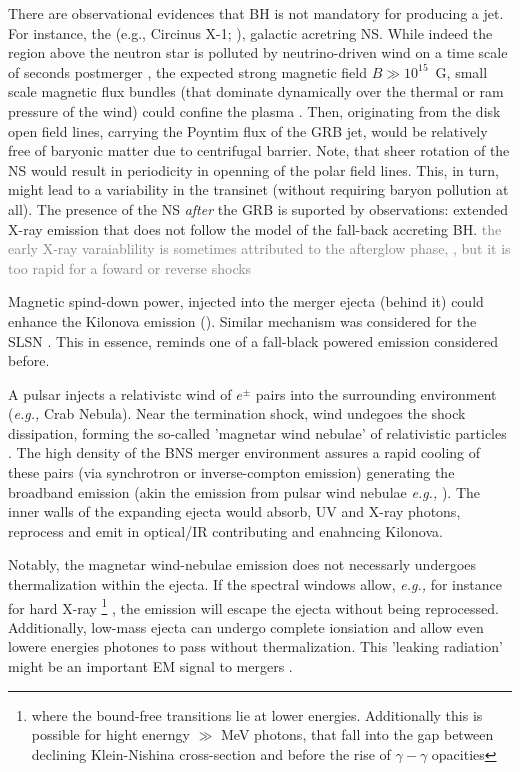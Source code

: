 \documentclass[11pt,a4paper,headinclude=true,DIV=14,BCOR=8mm,chapterprefix,listof=totoc,twoside,openright,abstracton]{scrbook}
\newcommand{\gray}[1]{\textcolor{gray}{#1}}
\begin{document}
There are observational evidences that BH is not mandatory for producing a jet. For instance, the (e.g., Circinus X-1; \cite{Fender et al 2004}), galactic acretring NS.
While indeed the region above the neutron star is polluted by neutrino-driven wind on a time scale of seconds postmerger \cite{(Dessart et al 2009; Murguia-Berthier et al 2014, 2016)}, the expected strong magnetic field $B\gg 10^{15}$~G, small scale magnetic flux bundles (that dominate dynamically over the thermal or ram pressure of the wind) could confine the plasma \cite{(Thompson 2003)}. Then, originating from the disk open field lines, carrying the Poyntim flux of the GRB jet, would be relatively free of baryonic matter due to centrifugal barrier. 
Note, that sheer rotation of the NS would result in periodicity in openning of the polar field lines. This, in turn, might lead to a variability in the transinet (without requiring baryon pollution at all). 
The presence of the NS \textit{after} the GRB is suported by observations: extended X-ray emission that does not follow the model of the fall-back accreting BH. 
\gray{the early X-ray varaiablility is sometimes attributed to the afterglow phase, \cite{(Holcomb et al 2014)}, but it is too rapid for a foward or reverse shocks}

Magnetic spind-down power, injected into the merger ejecta (behind it) could enhance the Kilonova emission (\cite{Yu et al (2013)}). Similar mechanism was considered for the SLSN \cite{(Kasen and Bildsten 2010; Woosley 2010; Metzger et al 2014)}. This in essence, reminds one of a fall-black powered emission considered before.

A pulsar injects a relativistc wind of $e^{\pm}$ pairs into the surrounding environment (\textit{e.g.,} Crab Nebula). Near the termination shock, wind undegoes the shock dissipation, forming the so-called 'magnetar wind nebulae' of relativistic particles \cite{(Kennel and Coroniti 1984)}. The high density of the BNS merger environment assures a rapid cooling of these pairs (via synchrotron or inverse-compton emission) \cite{(Metzger et al 2014; Siegel and Ciolfi2016a,b)} generating the broadband emission (akin the emission from pulsar wind nebulae \textit{e.g.,} \cite{Gaensler and Slane 2006)}). The inner walls of the expanding ejecta would absorb, UV and X-ray photons, reprocess and emit in optical/IR \cite{(Metzger et al 2014)} contributing and enahncing Kilonova.

Notably, the magnetar wind-nebulae emission does not necessarly undergoes thermalization within the ejecta. If the spectral windows allow, \textit{e.g.,} for instance for hard X-ray
\footnote{where the bound-free transitions lie at lower energies. Additionally this is possible for hight enerngy $\gg$ MeV photons, that fall into the gap between declining Klein-Nishina cross-section and before the rise of $\gamma-\gamma$ opacities}
, the emission will escape the ejecta without being reprocessed.
Additionally, low-mass ejecta can undergo complete ionsiation and allow even lowere energies photones to pass without thermalization. This 'leaking radiation' might be an important EM signal to mergers \cite{(Metzger and Piro 2014; Siegel and Ciolfi 2016a,b; Wang et al 2016).}. 
\end{document}
